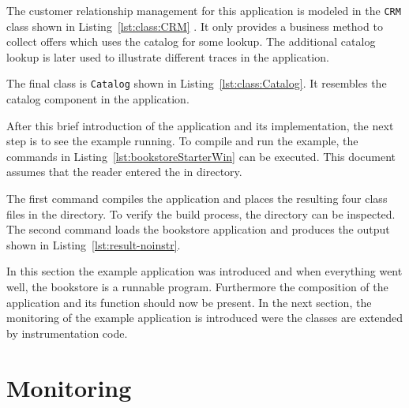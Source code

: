 \noindent The customer relationship management for this application is modeled in the \verb!CRM! class shown in Listing~\ref{lst:class:CRM} . It only provides a business method to collect offers which uses the catalog for some lookup. The additional catalog lookup is later used to illustrate different traces in the application.



\noindent The final class is \verb!Catalog! shown in Listing~\ref{lst:class:Catalog}. It resembles the catalog component in the application.



\noindent After this brief introduction of the application and its implementation, the next step is to see the example running. To compile and run the example, the commands in Listing~\ref{lst:bookstoreStarterWin} can be executed. This document assumes that the reader entered the in  directory.

\setBashListing
% 
%

\noindent The first command compiles the application and places the resulting four class files in the  directory. To verify the build process, the  directory can be inspected. The second command loads the bookstore application and produces the output shown in Listing~\ref{lst:result-noinstr}.



\noindent In this section the \Kieker{} example application was introduced and when everything went well, the bookstore is a runnable program. Furthermore the composition of the application and its function should now be present. In the next section, the monitoring of the example application is introduced were the classes are extended by instrumentation code.

\section{Monitoring}\label{sec:example:monitoring}

